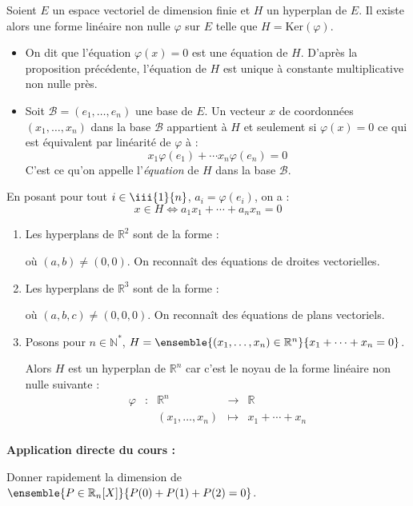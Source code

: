 \documentclass[french,11pt,twoside]{VcCours}
\newenvironment{ApplicationDirecte}{\textbf{Application directe du cours :}

}{}
\begin{document}
\begin{TheoremeDefinition}{} Soient $E$ un espace vectoriel de dimension finie et $H$ un hyperplan de $E$. Il existe alors une forme linéaire non nulle $\varphi$ sur $E$ telle que $H = \textrm{Ker}(\varphi)$. 

\begin{itemize}
\item On dit que l'équation $\varphi(x)=0$ est une équation de $H$. D'après la proposition précédente, l'équation de $H$ est unique à constante multiplicative non nulle près.
\item Soit $\mathcal{B}=(e_1, \ldots, e_n)$ une base de $E$. Un vecteur $x$ de coordonnées $(x_1, \ldots, x_n)$ dans la base $\mathcal{B}$ appartient à $H$ et seulement si $\varphi(x)=0$ ce qui est équivalent par linéarité de $\varphi$ à :
$$x_1 \varphi(e_1) + \cdots x_n \varphi(e_n) = 0$$
C'est ce qu'on appelle l'\emph{équation} de $H$ dans la base $\mathcal{B}$.
\end{itemize}
\end{TheoremeDefinition}

\begin{Remarque}{} En posant pour tout $i \in \iii{1}{n}$, $a_i = \varphi(e_i)$, on a :
$$ x \in H \Longleftrightarrow a_1 x_1 + \cdots + a_n x_n = 0$$
\end{Remarque}

\begin{Exemples}
\begin{enumerate}
\item Les hyperplans de $\mathbb{R}^2$ sont de la forme :

\vspace{1cm}

où $(a,b) \neq (0,0)$. On reconnaît des équations de droites vectorielles.
\item  Les hyperplans de $\mathbb{R}^3$ sont de la forme :

\vspace{1cm}
où $(a,b,c) \neq (0,0,0)$. On reconnaît des équations de plans vectoriels.
\item Posons pour $n \in \mathbb{N}^*$, 
$H = \ensemble{(x_1, \ldots, x_n) \in \mathbb{R}^n}{x_1 + \cdots + x_n = 0}$.

Alors $H$ est un hyperplan de $\mathbb{R}^n$ car c'est le noyau de la forme linéaire non nulle suivante :
$$ \begin{array}{ccccl}
\varphi & : & \mathbb{R}^n  & \rightarrow & \mathbb{R} \\
& & (x_1, \ldots, x_n) & \mapsto &  x_1 + \cdots + x_n \\
\end{array}$$
\end{enumerate}
\end{Exemples}

\begin{ApplicationDirecte} 
	Donner rapidement la dimension de 
	$\ensemble{P \in \mathbb{R}_n[X]}{P(0)+P(1)+P(2)= 0}$.
\end{ApplicationDirecte}
\end{document}
